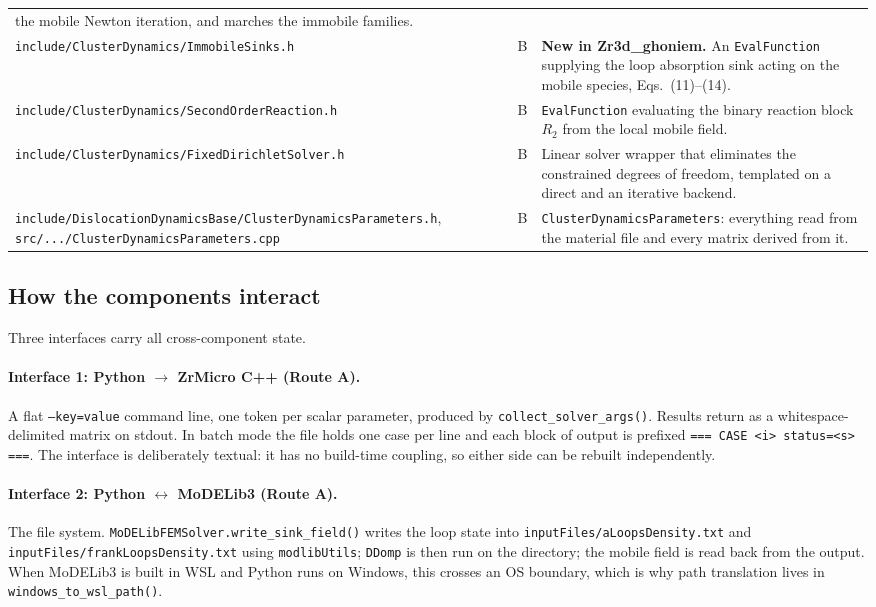 \documentclass[11pt]{article}
\newcommand{\ZrM}{\textsf{ZrMicro}}
\newcommand{\MoD}{\textsf{MoDELib3}}
\newcommand{\Zrd}{\textsf{Zr3d\_ghoniem}}
\newcommand{\code}[1]{\texttt{\small #1}}
\newcommand{\file}[1]{\texttt{\footnotesize #1}}
\newcommand{\drefs}[2]{Eqs.~(#1)--(#2)}
\begin{document}
\begin{longtable}{@{}p{}p{}p{}@{}}
  the mobile Newton iteration, and marches the immobile families. \\
\file{include/ClusterDynamics/ImmobileSinks.h} & B &
  \textbf{New in \Zrd{}.} An \code{EvalFunction} supplying the loop absorption
  sink acting on the mobile species, \drefs{11}{14}. \\
\file{include/ClusterDynamics/SecondOrderReaction.h} & B &
  \code{EvalFunction} evaluating the binary reaction block $R_2$ from the local
  mobile field. \\
\file{include/ClusterDynamics/FixedDirichletSolver.h} & B &
  Linear solver wrapper that eliminates the constrained degrees of freedom,
  templated on a direct and an iterative backend. \\
\file{include/DislocationDynamicsBase/ClusterDynamicsParameters.h},
\file{src/.../ClusterDynamicsParameters.cpp} & B &
  \code{ClusterDynamicsParameters}: everything read from the material file and
  every matrix derived from it. \\
\bottomrule
\end{longtable}

\subsection{How the components interact}
\label{sec:interfaces}

Three interfaces carry all cross-component state.

\paragraph*{Interface 1: Python $\rightarrow$ \ZrM{} C++ (Route A).}
A flat \code{--key=value} command line, one token per scalar parameter, produced
by \code{collect\_solver\_args()}. Results return as a whitespace-delimited
matrix on stdout. In batch mode the file holds one case per line and each block
of output is prefixed \code{=== CASE <i> status=<s> ===}. The interface is
deliberately textual: it has no build-time coupling, so either side can be
rebuilt independently.

\paragraph*{Interface 2: Python $\leftrightarrow$ \MoD{} (Route A).}
The file system. \code{MoDELibFEMSolver.write\_sink\_field()} writes the loop
state into \file{inputFiles/aLoopsDensity.txt} and
\file{inputFiles/frankLoopsDensity.txt} using \code{modlibUtils}; \code{DDomp} is
then run on the directory; the mobile field is read back from the output. When
\MoD{} is built in WSL and Python runs on Windows, this crosses an OS boundary,
which is why path translation lives in \code{windows\_to\_wsl\_path()}.
\end{document}
